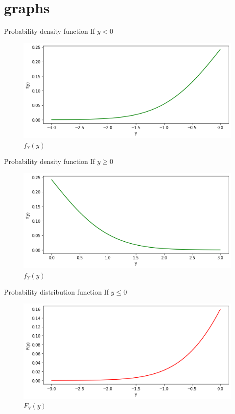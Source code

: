 \documentclass{beamer}
\begin{document}
\section{graphs}
\begin{frame}{Probability density function}
If $y<0$
    \begin{figure}[h]
    \centering
    \includegraphics[width=\columnwidth]{figures/f1.png}
    \caption{$f_Y(y)$}
    \label{Fig 1}
    \end{figure}
\end{frame}
\begin{frame}{Probability density function}
If $y \ge 0$
    \begin{figure}[h]
    \centering
    \includegraphics[width=\columnwidth]{figures/f2.png}
    \caption{$f_Y(y)$}
    \label{Fig 2}
    \end{figure}
\end{frame}
\begin{frame}{Probability distribution function}
If $y \leq 0$
    \begin{figure}[h]
    \centering
    \includegraphics[width=\columnwidth]{figures/F4.png}
    \caption{$F_Y(y)$}
    \label{Fig 3}
    \end{figure}
\end{frame}
\end{document}
